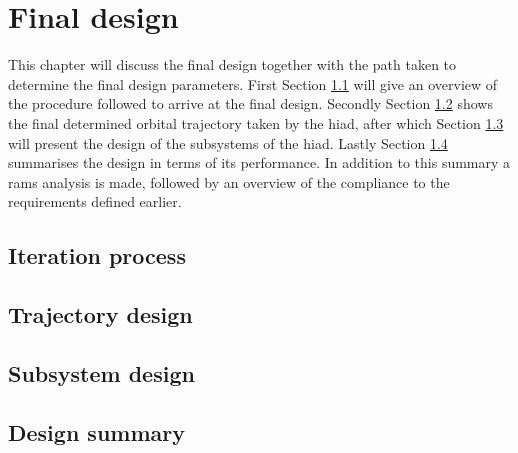 \section{Final design}\label{cha:finaldesign}
This chapter will discuss the final design together with the path taken to determine the final design parameters. First Section \ref{sec:iterationprocess} will give an overview of the procedure followed to arrive at the final design. Secondly Section \ref{sec:trajectorydesign} shows the final determined orbital trajectory taken by the \gls{hiad}, after which Section \ref{sec:subsystemdesign} will present the design of the subsystems of the \gls{hiad}. Lastly Section \ref{sec:designsummary} summarises the design in terms of its performance. In addition to this summary a \gls{rams} analysis is made, followed by an overview of the compliance to the requirements defined earlier.

\subsection{Iteration process} \label{sec:iterationprocess}


\subsection{Trajectory design} \label{sec:trajectorydesign}


\subsection{Subsystem design} \label{sec:subsystemdesign}


\newpage
\subsection{Design summary} \label{sec:designsummary}


